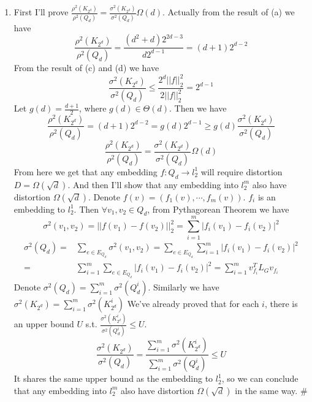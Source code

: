 \documentclass[twoside,11pt]{homework}
\begin{document}
\begin{enumerate}
    \item
    First I'll prove $\frac{\rho^2(K_{2^d})}{\rho^2(Q_d)} = \frac{\sigma^2(K_{2^d})}{\sigma^2(Q_d)}\Omega(d)$.
    Actually from the result of (a) we have
    $$\frac{\rho^2(K_{2^d})}{\rho^2(Q_d)} = \frac{(d^2+d)2^{2d-3}}{d2^{d-1}} = (d+1)2^{d-2}$$
    From the result of (c) and (d) we have
    $$\frac{\sigma^2(K_{2^d})}{\sigma^2(Q_d)} \leq \frac{2^d||f||_2^2}{2||f||_2^2} = 2^{d-1}$$
    Let $g(d)=\frac{d+1}{2}$, where $g(d) \in \Theta(d)$.
    Then we have $$\frac{\rho^2(K_{2^d})}{\rho^2(Q_d)} = (d+1)2^{d-2} = g(d)2^{d-1} \geq g(d) \frac{\sigma^2(K_{2^d})}{\sigma^2(Q_d)}$$
    $$\frac{\rho^2(K_{2^d})}{\rho^2(Q_d)} = \frac{\sigma^2(K_{2^d})}{\sigma^2(Q_d)}\Omega(d) $$
    \newline
    From here we get that any embedding $f: Q_d \rightarrow l_2^1$ will require distortion $D=\Omega(\sqrt{d})$. And then I'll show that any embedding into $l_2^m$ also have distortion $\Omega(\sqrt{d})$.
    \newline
    Denote $f(v) = (f_1(v),\cdots,f_m(v))$. $f_i$ is an embedding to $l_2^1$.
    Then $\forall v_1,v_2 \in Q_d$, from Pythagorean Theorem we have
    $$\sigma^2(v_1,v_2) =||f(v_1)-f(v_2)||_2^2 = \sum_{i=1}^m|f_i(v_1)-f_i(v_2)|^2$$
    \begin{align*}
        \sigma^2(Q_d) =&\sum_{e \in E_{Q_d}}\sigma^2(v_1,v_2) = \sum_{e \in E_{Q_d}} \sum_{i=1}^m |f_i(v_1)-f_i(v_2)|^2 \\=&\sum_{i=1}^m \sum_{e \in E_{Q_d}}  |f_i(v_1)-f_i(v_2)|^2 = \sum_{i=1}^m v_{f_i}^TL_Gv_{f_i}
    \end{align*}
    Denote $\sigma^2(Q_d) = \sum_{i=1}^m \sigma^2(Q_d^i)$. Similarly we have $\sigma^2(K_{2^d}) = \sum_{i=1}^m \sigma^2(K_{2^d}^i)$ 
    We've already proved that for each $i$, there is an upper bound $U$ s.t. $\frac{\sigma^2(K_{2^d}^i)}{\sigma^2(Q_d^i)} \leq U$.
    $$\frac{\sigma^2(K_{2^d})}{\sigma^2(Q_d)} = \frac{\sum_{i=1}^m\sigma^2(K_{2^d}^i)}{\sum_{i=1}^m \sigma^2(Q_d^i)} \leq U$$
    It shares the same upper bound as the embedding to $l_2^1$, so we can conclude that any embedding into $l_2^m$ also have distortion $\Omega(\sqrt{d})$ in the same way. \#
   
    
\end{enumerate}
\end{document}
